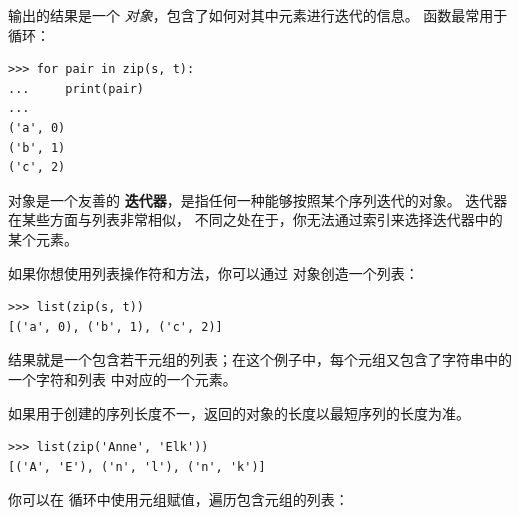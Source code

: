 {输出的结果是一个 {\em {} 对象}，包含了如何对其中元素进行迭代的信息。
 函数最常用于  循环：

\begin{lstlisting}
>>> for pair in zip(s, t):
...     print(pair)
...
('a', 0)
('b', 1)
('c', 2)
\end{lstlisting}

%

\href{https://docs.python.org/3/library/functions.html#zip}{}对象是一个友善的 {\bf 迭代器}，是指任何一种能够按照某个序列迭代的对象。 迭代器在某些方面与列表非常相似， 不同之处在于，你无法通过索引来选择迭代器中的某个元素。
 


如果你想使用列表操作符和方法，你可以通过 对象创造一个列表：

\begin{lstlisting}
>>> list(zip(s, t))
[('a', 0), ('b', 1), ('c', 2)]
\end{lstlisting}

%

结果就是一个包含若干元组的列表；在这个例子中，每个元组又包含了字符串中的一个字符和列表  中对应的一个元素。


如果用于创建的序列长度不一，返回的对象的长度以最短序列的长度为准。

\begin{lstlisting}
>>> list(zip('Anne', 'Elk'))
[('A', 'E'), ('n', 'l'), ('n', 'k')]
\end{lstlisting}

%

你可以在  循环中使用元组赋值，遍历包含元组的列表：

  

}
